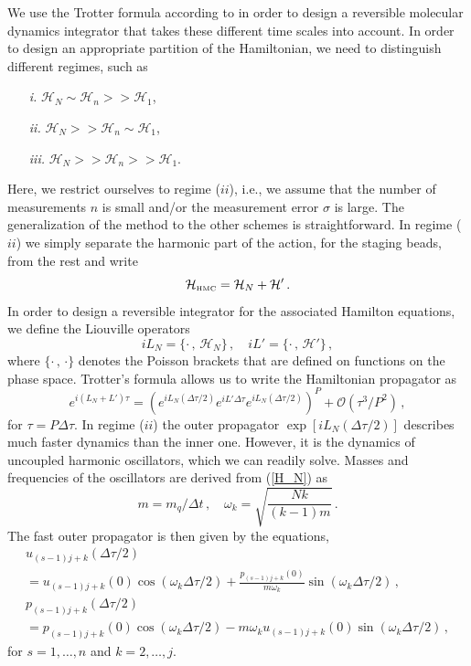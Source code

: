 \documentclass[12pt,a4paper,final]{iopart}
\begin{document}
We use the Trotter formula according to \cite{tuckerman_1992} in order to design a reversible molecular dynamics integrator that takes these different time scales into account.
In order to design an appropriate partition of the Hamiltonian, we need to distinguish different regimes, such as
\begin{enumerate}
  \item[\it i.]
  $\mathcal H_N \sim \mathcal H_n >> \mathcal H_1$,
  \item[\it ii.]
  $\mathcal H_N >> \mathcal H_n \sim \mathcal H_1$,
  \item[\it iii.]
  $\mathcal H_N >> \mathcal H_n >> \mathcal H_1$.
\end{enumerate}
Here, we restrict ourselves to regime ($ii$), i.e., we assume that the number of measurements $n$ is small and/or the measurement error $\sigma$ is large.
The generalization of the method to the other schemes is straightforward.
In regime ($ii$) we simply separate the harmonic part of the action, for the staging beads, from the rest and write
\begin{equation}
  \mathcal{H}_{\mbox{\tiny HMC}}=\mathcal H_N + \mathcal H'\,.
\end{equation}
In order to design a reversible integrator for the associated Hamilton equations, we define the Liouville operators
\begin{equation}
  iL_N=\{\cdot\,,\,\mathcal H_N\}\,,\quad
  iL'=\{\cdot\,,\,\mathcal H'\}\,,
\end{equation}
where $\{\cdot\,,\,\cdot\}$ denotes the Poisson brackets that are defined on functions on the phase space.
Trotter's formula \cite{trotter_1959} allows us to write the Hamiltonian propagator as
\begin{equation}\label{propagator}
  e^{i(L_N+L')\tau}
  =
  (e^{iL_N(\Delta\tau/2)}e^{iL'\Delta\tau}e^{iL_N(\Delta\tau/2)})^P
  +
  \mathcal O(\tau^3/P^{2})\,,
\end{equation}
for $\tau =P\Delta \tau$.
In regime ($ii$) the outer propagator $\exp[iL_N(\Delta \tau/2)]$ describes much faster dynamics than the inner one. However, it is the dynamics of uncoupled harmonic oscillators, which we can readily solve.
Masses and frequencies of the oscillators are derived from (\ref{H_N}) as
\begin{equation}
  m=m_q/\Delta t\,,\quad
  \omega_k=\sqrt{\frac{Nk}{(k-1)m}}\,.
\end{equation}
The fast outer propagator is then given by the equations,
\begin{eqnarray}
  u_{(s-1)j+k}(\Delta\tau/2) \nonumber \\
  = u_{(s-1)j+k}(0)\cos(\omega_k\Delta\tau/2)
  +
  \frac{p_{(s-1)j+k}(0)}{m\omega_k}\sin(\omega_k\Delta\tau/2)\,,\\
  p_{(s-1)j+k}(\Delta\tau/2) \nonumber \\
  = p_{(s-1)j+k}(0)\cos(\omega_k\Delta\tau/2)
  -
  m\omega_k u_{(s-1)j+k}(0) \sin(\omega_k\Delta\tau/2)\,,
\end{eqnarray}
for $s=1,\dots,n$ and $k=2,\dots,j$.
\end{document}
